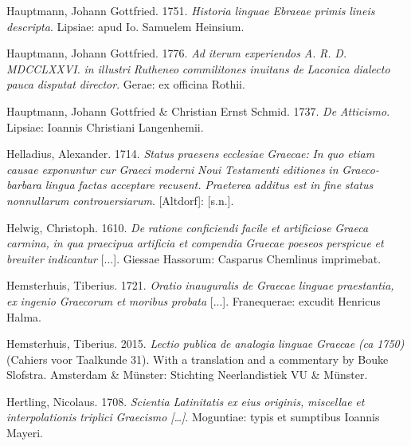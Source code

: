 \documentclass[output=paper]{langsci/langscibook}
\begin{document}
Hauptmann, Johann Gottfried. 1751. \textit{Historia} \textit{linguae} \textit{Ebraeae} \textit{primis} \textit{lineis} \textit{descripta}. Lipsiae: apud Io. Samuelem Heinsium.

Hauptmann, Johann Gottfried. 1776. \textit{Ad} \textit{iterum} \textit{experiendos} \textit{A.} \textit{R.} \textit{D.} \textit{MDCCLXXVI.} \textit{in} \textit{illustri} \textit{Rutheneo} \textit{commilitones} \textit{inuitans} \textit{de} \textit{Laconica} \textit{dialecto} \textit{pauca} \textit{disputat} \textit{director}. Gerae: ex officina Rothii.

Hauptmann, Johann Gottfried \& Christian Ernst Schmid. 1737. \textit{De} \textit{Atticismo}. Lipsiae: Ioannis Christiani Langenhemii.

Helladius, Alexander. 1714. \textit{Status} \textit{praesens} \textit{ecclesiae} \textit{Graecae:} \textit{In} \textit{quo} \textit{etiam} \textit{causae} \textit{exponuntur} \textit{cur} \textit{Graeci} \textit{moderni} \textit{Noui} \textit{Testamenti} \textit{editiones} \textit{in} \textit{Graeco-barbara} \textit{lingua} \textit{factas} \textit{acceptare} \textit{recusent.} \textit{Praeterea} \textit{additus} \textit{est} \textit{in} \textit{fine} \textit{status} \textit{nonnullarum} \textit{controuersiarum}. [Altdorf]: [s.n.].

Helwig, Christoph. 1610. \textit{De} \textit{ratione} \textit{conficiendi} \textit{facile} \textit{et} \textit{artificiose} \textit{Graeca} \textit{carmina,} \textit{in} \textit{qua} \textit{praecipua} \textit{artificia} \textit{et} \textit{compendia} \textit{Graecae} \textit{poeseos} \textit{perspicue} \textit{et} \textit{breuiter} \textit{indicantur} [...]. Giessae Hassorum: Casparus Chemlinus imprimebat.

Hemsterhuis, Tiberius. 1721. \textit{Oratio} \textit{inauguralis} \textit{de} \textit{Graecae} \textit{linguae} \textit{praestantia,} \textit{ex} \textit{ingenio} \textit{Graecorum} \textit{et} \textit{moribus} \textit{probata} [...]. Franequerae: excudit Henricus Halma.

Hemsterhuis, Tiberius. 2015. \textit{Lectio} \textit{publica} \textit{de} \textit{analogia} \textit{linguae} \textit{Graecae} \textit{(ca} \textit{1750)} (Cahiers voor Taalkunde 31). With a translation and a commentary by Bouke Slofstra. Amsterdam \& Münster: Stichting Neerlandistiek VU \& Münster.

Hertling, Nicolaus. 1708. \textit{Scientia} \textit{Latinitatis} \textit{ex} \textit{eius} \textit{originis,} \textit{miscellae} \textit{et} \textit{interpolationis} \textit{triplici} \textit{Graecismo} \textit{[…]}. Moguntiae: typis et sumptibus Ioannis Mayeri.
\end{document}
